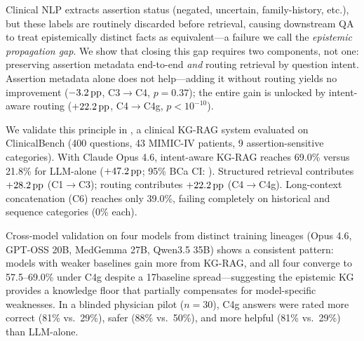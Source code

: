 
Clinical NLP extracts assertion status (negated, uncertain, family-history, etc.), but these labels are routinely discarded before retrieval, causing downstream QA to treat epistemically distinct facts as equivalent---a failure we call the \emph{epistemic propagation gap}.
We show that closing this gap requires two components, not one: preserving assertion metadata end-to-end \emph{and} routing retrieval by question intent.
Assertion metadata alone does not help---adding it without routing yields no improvement ($-3.2\,\text{pp}$, C3$\to$C4, $p = 0.37$); the entire gain is unlocked by intent-aware routing ($+22.2\,\text{pp}$, C4$\to$C4g, $p < 10^{-10}$).

We validate this principle in \epikg, a clinical KG-RAG system evaluated on ClinicalBench (400 questions, 43 MIMIC-IV patients, 9 assertion-sensitive categories).
With Claude Opus 4.6, intent-aware KG-RAG reaches 69.0\% versus 21.8\% for LLM-alone ($+47.2\,\text{pp}$; 95\% BCa CI: \ci{+40.9\pp}{+52.8\pp}).
Structured retrieval contributes $+28.2\,\text{pp}$ (C1$\to$C3); routing contributes $+22.2\,\text{pp}$ (C4$\to$C4g).
Long-context concatenation (C6) reaches only 39.0\%, failing completely on historical and sequence categories (0\% each).

Cross-model validation on four models from distinct training lineages (Opus 4.6, GPT-OSS 20B, MedGemma 27B, Qwen3.5 35B) shows a consistent pattern: models with weaker baselines gain more from KG-RAG, and all four converge to 57.5--69.0\% under C4g despite a 17\pp baseline spread---suggesting the epistemic KG provides a knowledge floor that partially compensates for model-specific weaknesses.
In a blinded physician pilot ($n=30$), C4g answers were rated more correct (81\% vs.\ 29\%), safer (88\% vs.\ 50\%), and more helpful (81\% vs.\ 29\%) than LLM-alone.
